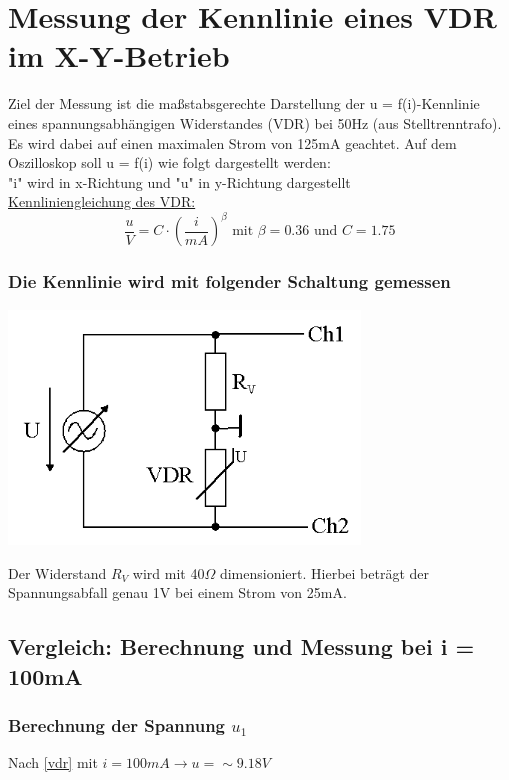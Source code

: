 \documentclass[11pt,a4paper,titlepage]{article}
\begin{document}
\section{Messung der Kennlinie eines VDR im X-Y-Betrieb}
Ziel der Messung ist die ma\ss{}stabsgerechte Darstellung der u = f(i)-Kennlinie eines spannungsabh\"angigen Widerstandes (VDR) bei 50Hz (aus Stelltrenntrafo). Es wird dabei auf einen maximalen Strom von 125mA geachtet. Auf dem Oszilloskop soll u = f(i) wie folgt dargestellt werden: \\[1ex] 
"i" wird in x-Richtung und "u" in y-Richtung dargestellt \\

\underline{Kennliniengleichung des VDR:} \\[1ex]
\begin{equation}\label{vdr}
\frac{u}{V}=C\cdot(\frac{i}{mA})^{\beta} \text{ mit } \beta = 0.36 \text{ und } C = 1.75 
\end{equation}
\subsubsection*{Die Kennlinie wird mit folgender Schaltung gemessen}
\begin{center}
\includegraphics[width=0.7\textwidth]{gep2v5_2}
\end{center}
Der Widerstand $R_V$ wird mit 40$\Omega$ dimensioniert. Hierbei betr\"agt der Spannungsabfall genau 1V bei einem Strom von 25mA.
\newpage
\subsection{Vergleich: Berechnung und Messung bei i = 100mA}
\subsubsection{Berechnung der Spannung $u_1$}
Nach \eqref{vdr} mit $i = 100mA \to u = \sim9.18V$
\end{document}
